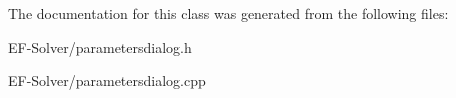 The documentation for this class was generated from the following files\+:\begin{DoxyCompactItemize}
\item 
E\+F-\/\+Solver/parametersdialog.\+h\item 
E\+F-\/\+Solver/parametersdialog.\+cpp\end{DoxyCompactItemize}
